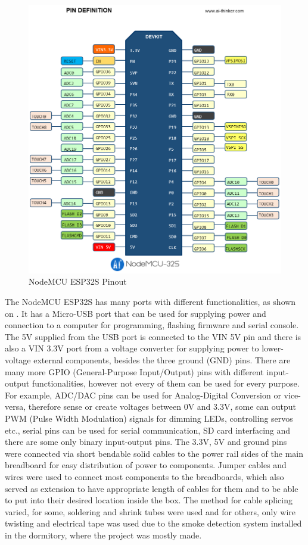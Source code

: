 \begin{figure}[!ht]
    \centering
    \includegraphics[width=150mm, keepaspectratio]{figures/nodemcu_32s_pinout.png}
    \caption{NodeMCU ESP32S Pinout}
    \label{fig:NodeMCU32Pinout}
\end{figure}

The NodeMCU ESP32S has many ports with different functionalities, as shown on . \cite{AIThinkerNodeMCU32} It has a Micro-USB port that can be used for supplying power and connection to a computer for programming, flashing firmware and serial console. The 5V supplied from the USB port is connected to the VIN 5V pin and there is also a VIN 3.3V port from a voltage converter for supplying power to lower-voltage external components, besides the three ground (GND) pins. There are many more GPIO (General-Purpose Input/Output) pins with different input-output functionalities, however not every of them can be used for every purpose. For example, ADC/DAC pins can be used for Analog-Digital Conversion or vice-versa, therefore sense or create voltages between 0V and 3.3V, some can output PWM (Pulse Width Modulation) signals for dimming LEDs, controlling servos etc., serial pins can be used for serial communication, SD card interfacing and there are some only binary input-output pins. The 3.3V, 5V and ground pins were connected via short bendable solid cables to the power rail sides of the main breadboard for easy distribution of power to components. Jumper cables and wires were used to connect most components to the breadboards, which also served as extension to have appropriate length of cables for them and to be able to put into their desired location inside the box. The method for cable splicing varied, for some, soldering and shrink tubes were used and for others, only wire twisting and electrical tape was used due to the smoke detection system installed in the dormitory, where the project was mostly made.

